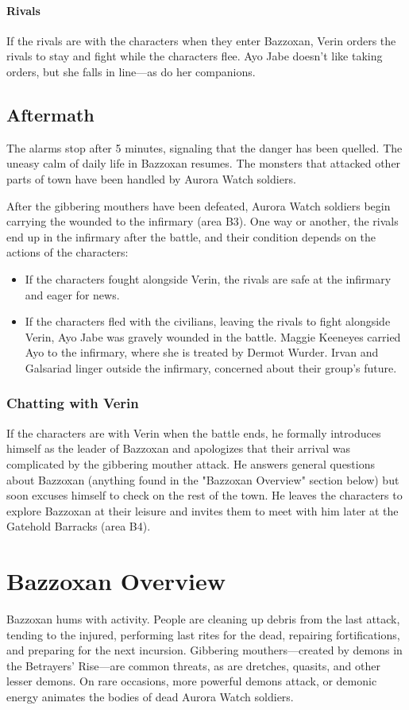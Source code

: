 \documentclass[10pt,a4paper,twoside,bg=print,twocolumn,openany,nodeprecatedcode]{dndbook}
\begin{document}
\paragraph{Rivals}
If the rivals are with the characters when they enter Bazzoxan, Verin orders the rivals to stay and fight while the characters flee. Ayo Jabe doesn't like taking orders, but she falls in line—as do her companions.

\subsection{Aftermath}
The alarms stop after 5 minutes, signaling that the danger has been quelled. The uneasy calm of daily life in Bazzoxan resumes. The monsters that attacked other parts of town have been handled by Aurora Watch soldiers.

After the gibbering mouthers have been defeated, Aurora Watch soldiers begin carrying the wounded to the infirmary (area B3). One way or another, the rivals end up in the infirmary after the battle, and their condition depends on the actions of the characters:


\begin{itemize}
\item If the characters fought alongside Verin, the rivals are safe at the infirmary and eager for news.
\item If the characters fled with the civilians, leaving the rivals to fight alongside Verin, Ayo Jabe was gravely wounded in the battle. Maggie Keeneyes carried Ayo to the infirmary, where she is treated by Dermot Wurder. Irvan and Galsariad linger outside the infirmary, concerned about their group's future.
\end{itemize}


\subsubsection{Chatting with Verin}
If the characters are with Verin when the battle ends, he formally introduces himself as the leader of Bazzoxan and apologizes that their arrival was complicated by the gibbering mouther attack. He answers general questions about Bazzoxan (anything found in the "Bazzoxan Overview" section below) but soon excuses himself to check on the rest of the town. He leaves the characters to explore Bazzoxan at their leisure and invites them to meet with him later at the Gatehold Barracks (area B4).

\section{Bazzoxan Overview}
Bazzoxan hums with activity. People are cleaning up debris from the last attack, tending to the injured, performing last rites for the dead, repairing fortifications, and preparing for the next incursion. Gibbering mouthers—created by demons in the Betrayers' Rise—are common threats, as are dretches, quasits, and other lesser demons. On rare occasions, more powerful demons attack, or demonic energy animates the bodies of dead Aurora Watch soldiers.
\end{document}
